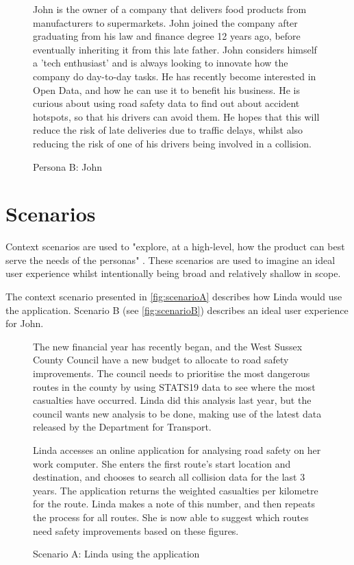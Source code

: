\documentclass[authoryearcitations]{UoYCSproject}
\begin{document}
\begin{figure}
	\begin{framed}
 		John is the owner of a company that delivers food products from manufacturers to supermarkets. John joined the company after graduating from his law and finance degree 12 years ago, before eventually inheriting it from this late father. John considers himself a 'tech enthusiast' and is always looking to innovate how the company do day-to-day tasks. He has recently become interested in Open Data, and how he can use it to benefit his business. He is curious about using road safety data to find out about accident hotspots, so that his drivers can avoid them. He hopes that this will reduce the risk of late deliveries due to traffic delays, whilst also reducing the risk of one of his drivers being involved in a collision. 	\end{framed}
  \caption{Persona B: John}
  \label{fig:personaB}
\end{figure}


\section{Scenarios}

Context scenarios are used to "explore, at a high-level, how the product can best serve the needs of the personas" \citep{Cooper2007}. These scenarios are used to imagine an ideal user experience whilst intentionally being broad and relatively shallow in scope.

The context scenario presented in \autoref{fig:scenarioA} describes how Linda would use the application. Scenario B (see \autoref{fig:scenarioB}) describes an ideal user experience for John.

\begin{figure}
	\begin{framed}
		The new financial year has recently began, and the West Sussex County Council have a new budget to allocate to road safety improvements. The council needs to prioritise the most dangerous routes in the county by using STATS19 data to see where the most casualties have occurred. Linda did this analysis last year, but the council wants new analysis to be done, making use of the latest data released by the Department for Transport.
		
		Linda accesses an online application for analysing road safety on her work computer. She enters the first route's start location and destination, and chooses to search all collision data for the last 3 years. The application returns the weighted casualties per kilometre for the route. Linda makes a note of this number, and then repeats the process for all routes. She is now able to suggest which routes need safety improvements based on these figures.
  	\end{framed}
  \caption{Scenario A: Linda using the application}
  \label{fig:scenarioA}
\end{figure}
\end{document}
